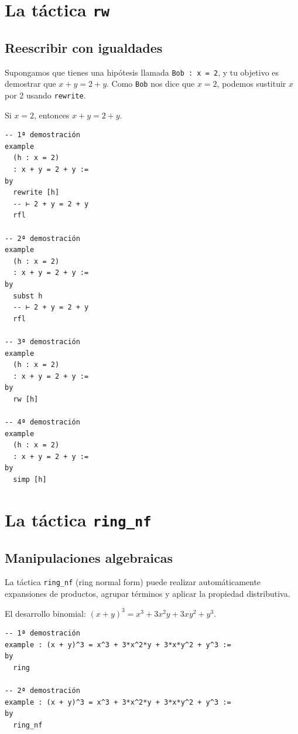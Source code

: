 \section{La táctica \texttt{rw}}

\subsection*{Reescribir con igualdades}

Supongamos que tienes una hipótesis llamada \texttt{Bob : x = 2}, y tu
objetivo es demostrar que $x + y = 2 + y$. Como \texttt{Bob} nos dice
que $x = 2$, podemos sustituir $x$ por 2 usando \texttt{rewrite}.

\begin{theorem}
Si $x = 2$, entonces $x + y = 2 + y$.
\end{theorem}

\begin{verbatim}
-- 1ª demostración
example
  (h : x = 2)
  : x + y = 2 + y :=
by
  rewrite [h]
  -- ⊢ 2 + y = 2 + y
  rfl

-- 2ª demostración
example
  (h : x = 2)
  : x + y = 2 + y :=
by
  subst h
  -- ⊢ 2 + y = 2 + y
  rfl

-- 3ª demostración
example
  (h : x = 2)
  : x + y = 2 + y :=
by
  rw [h]

-- 4ª demostración
example
  (h : x = 2)
  : x + y = 2 + y :=
by
  simp [h]
\end{verbatim}

\section{La táctica \texttt{ring\_nf}}

\subsection*{Manipulaciones algebraicas}

La táctica \texttt{ring\_nf} (ring normal form) puede realizar
automáticamente expansiones de productos, agrupar términos y aplicar la
propiedad distributiva.

\begin{theorem}
El desarrollo binomial: $(x + y)^3 = x^3 + 3x^2y + 3xy^2 + y^3$.
\end{theorem}

\begin{verbatim}
-- 1ª demostración
example : (x + y)^3 = x^3 + 3*x^2*y + 3*x*y^2 + y^3 :=
by
  ring

-- 2ª demostración
example : (x + y)^3 = x^3 + 3*x^2*y + 3*x*y^2 + y^3 :=
by
  ring_nf
\end{verbatim}

